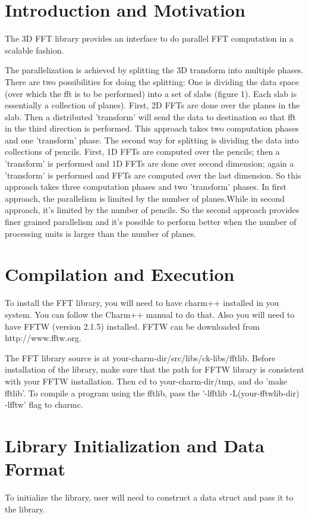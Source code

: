 
\section{Introduction and Motivation}
The 3D FFT library provides an interface to do parallel FFT computation
in a scalable fashion. 

The parallelization is achieved by splitting the 3D transform into
multiple phases. There are two possibilities for doing the splitting:
One is dividing the data space (over which the fft is to be performed)
into a set of slabs (figure 1). Each slab is essentially a collection
of planes). First, 2D FFTs are done over the planes in the slab. Then
a distributed 'transform' will send the data to destination so that
fft in the third direction is performed. This approach takes two
computation phases and one 'transform' phase. The second way for
splitting is dividing the data into collections of pencils. First, 1D
FFTs are computed over the pencils; then a 'transform' is performed
and 1D FFTs are done over second dimension; again a 'transform' is
performed and FFTs are computed over the last dimension. So this
approach takes three computation phases and two 'transform' phases. In
first approach, the parallelism is limited by the number of
planes.While in second approach, it's limited by the number of
pencils. So the second approach provides finer grained parallelism and
it's possible to perform better when the number of processing units is
larger than the number of planes.

\section{Compilation and Execution}

To install the FFT library, you will need to have charm++ installed in
you system. You can follow the Charm++ manual to do that. Also you
will need to have FFTW (version 2.1.5) installed. FFTW can be
downloaded from http://www.fftw.org.

The FFT library source is at
your-charm-dir/src/libs/ck-libs/fftlib. Before installation of the
library, make sure that the path for FFTW library is consistent with
your FFTW installation. Then cd to your-charm-dir/tmp, and do 'make
fftlib'. To compile a program using the fftlib, pass the '-lfftlib
-L(your-fftwlib-dir) -lfftw' flag to charmc.

\section{Library Initialization and Data Format} 
To initialize the library, user will need to construct a data struct and pass it to the library. 


